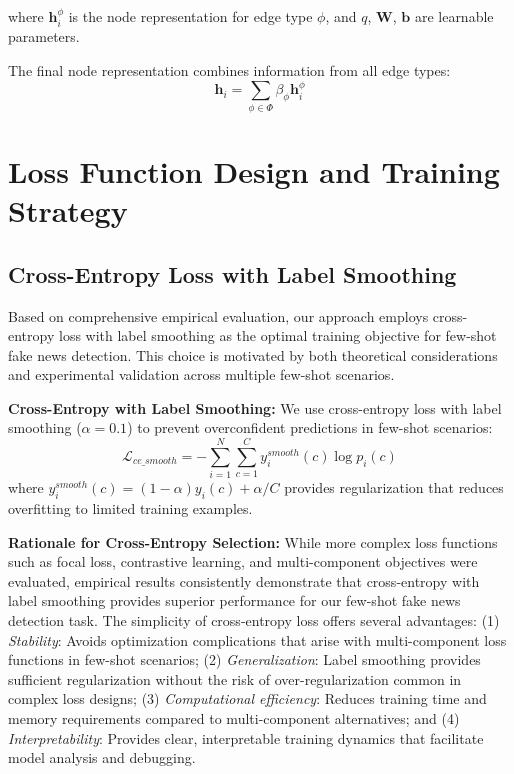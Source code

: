 where $\mathbf{h}_i^{\phi}$ is the node representation for edge type $\phi$, and $q$, $\mathbf{W}$, $\mathbf{b}$ are learnable parameters.

The final node representation combines information from all edge types:
\begin{equation}
\mathbf{h}_i = \sum_{\phi \in \Phi} \beta_{\phi} \mathbf{h}_i^{\phi}
\end{equation}

\section{Loss Function Design and Training Strategy}

\subsection{Cross-Entropy Loss with Label Smoothing}

Based on comprehensive empirical evaluation, our approach employs cross-entropy loss with label smoothing as the optimal training objective for few-shot fake news detection. This choice is motivated by both theoretical considerations and experimental validation across multiple few-shot scenarios.

\textbf{Cross-Entropy with Label Smoothing:} We use cross-entropy loss with label smoothing ($\alpha = 0.1$) to prevent overconfident predictions in few-shot scenarios:
\begin{equation}
\mathcal{L}_{ce\_smooth} = -\sum_{i=1}^{N} \sum_{c=1}^{C} y_i^{smooth}(c) \log p_i(c)
\end{equation}
where $y_i^{smooth}(c) = (1-\alpha)y_i(c) + \alpha/C$ provides regularization that reduces overfitting to limited training examples.

\textbf{Rationale for Cross-Entropy Selection:} While more complex loss functions such as focal loss, contrastive learning, and multi-component objectives were evaluated, empirical results consistently demonstrate that cross-entropy with label smoothing provides superior performance for our few-shot fake news detection task. The simplicity of cross-entropy loss offers several advantages: (1) \emph{Stability}: Avoids optimization complications that arise with multi-component loss functions in few-shot scenarios; (2) \emph{Generalization}: Label smoothing provides sufficient regularization without the risk of over-regularization common in complex loss designs; (3) \emph{Computational efficiency}: Reduces training time and memory requirements compared to multi-component alternatives; and (4) \emph{Interpretability}: Provides clear, interpretable training dynamics that facilitate model analysis and debugging.

